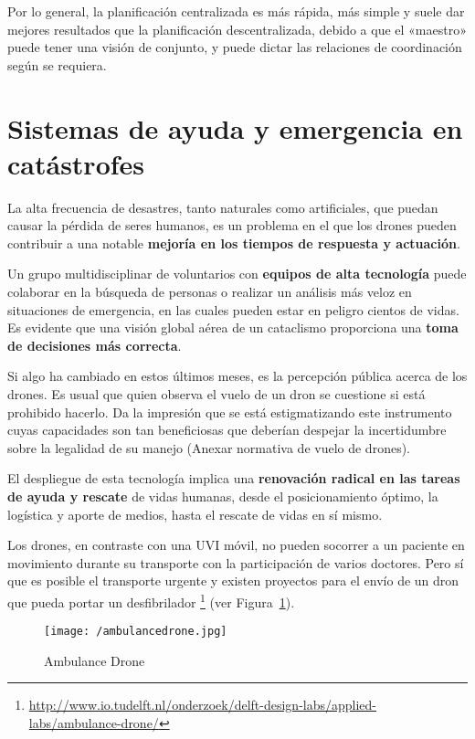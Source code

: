 Por lo general, la planificación centralizada es más rápida, más simple y suele dar mejores resultados que la planificación descentralizada, debido a que el «maestro» puede tener una visión de conjunto, y puede dictar las relaciones de coordinación según se requiera. 	

\section{Sistemas de ayuda y emergencia en catástrofes}
\label{sec:sistemas}

La alta frecuencia de desastres, tanto naturales como artificiales, que puedan causar la pérdida de seres humanos, es un problema en el que los drones pueden contribuir a una notable \textbf{mejoría en los tiempos de respuesta y actuación}.

Un grupo multidisciplinar de voluntarios con \textbf{equipos de alta tecnología} puede colaborar en la búsqueda de personas o realizar un análisis más veloz en situaciones de emergencia, en las cuales pueden estar en peligro cientos de vidas. Es evidente que una visión global aérea de un cataclismo proporciona una \textbf{toma de decisiones más correcta}.

Si algo ha cambiado en estos últimos meses, es la percepción pública acerca de los drones. Es usual que quien observa el vuelo de un dron se cuestione si está prohibido hacerlo. Da la impresión que se está estigmatizando este instrumento cuyas capacidades son tan beneficiosas que deberían despejar la incertidumbre sobre la legalidad de su manejo (Anexar normativa de vuelo de drones).

El despliegue de esta tecnología implica una \textbf{renovación radical en las tareas de ayuda y rescate} de vidas humanas, desde el posicionamiento óptimo, la logística y aporte de medios, hasta el rescate de vidas en sí mismo.

Los drones, en contraste con una UVI móvil, no pueden socorrer a un paciente en movimiento durante su transporte con la participación de varios doctores. Pero sí que es posible el transporte urgente y existen proyectos para el envío de un dron que pueda portar un desfibrilador \footnote{\url{http://www.io.tudelft.nl/onderzoek/delft-design-labs/applied-labs/ambulance-drone/}} (ver Figura~\ref{fig:ambulancedrone}).

\begin{figure}[!h]
\begin{center}
\texttt{[image: /ambulancedrone.jpg]}
\caption[Ambulance Drone]{Ambulance Drone}
\label{fig:ambulancedrone}
\end{center}
\end{figure}

